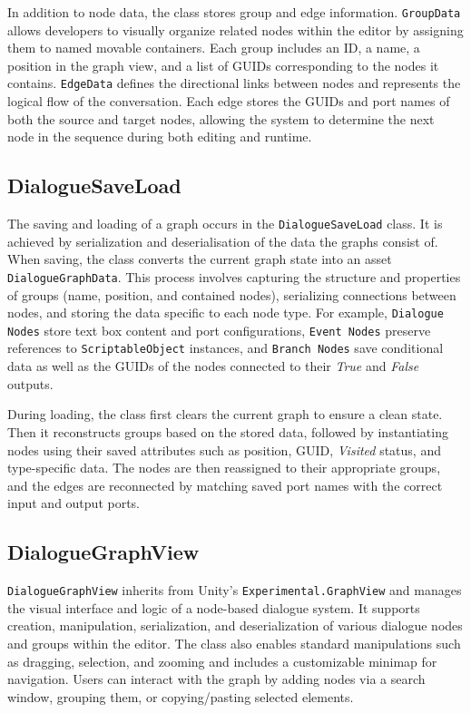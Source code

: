 In addition to node data, the class stores group and edge information. \verb|GroupData| allows developers to visually organize related nodes within the editor by assigning them to named movable containers. Each group includes an ID, a name, a position in the graph view, and a list of GUIDs corresponding to the nodes it contains. \verb|EdgeData| defines the directional links between nodes and represents the logical flow of the conversation. Each edge stores the GUIDs and port names of both the source and target nodes, allowing the system to determine the next node in the sequence during both editing and runtime.


\subsection{DialogueSaveLoad}
\label{devlog:DialogueSaveLoad}
The saving and loading of a graph occurs in the \verb|DialogueSaveLoad| class. It is achieved by serialization and deserialisation of the data the graphs consist of. When saving, the class converts the current graph state into an asset \verb|DialogueGraphData|. This process involves capturing the structure and properties of groups (name, position, and contained nodes), serializing connections between nodes, and storing the data specific to each node type. For example, \verb|Dialogue Nodes| store text box content and port configurations, \verb|Event Nodes| preserve references to \verb|ScriptableObject| instances, and \verb|Branch Nodes| save conditional data as well as the GUIDs of the nodes connected to their \textit{True} and \textit{False} outputs.

During loading, the class first clears the current graph to ensure a clean state. Then it reconstructs groups based on the stored data, followed by instantiating nodes using their saved attributes such as position, GUID, \textit{Visited} status, and type-specific data. The nodes are then reassigned to their appropriate groups, and the edges are reconnected by matching saved port names with the correct input and output ports.


\subsection{DialogueGraphView}
\label{devlog:DialogueGraphView}
\verb|DialogueGraphView| inherits from Unity's \verb|Experimental.GraphView| and manages the visual interface and logic of a node-based dialogue system. It supports creation, manipulation, serialization, and deserialization of various dialogue nodes and groups within the editor. The class also enables standard manipulations such as dragging, selection, and zooming and includes a customizable minimap for navigation. Users can interact with the graph by adding nodes via a search window, grouping them, or copying/pasting selected elements. 

